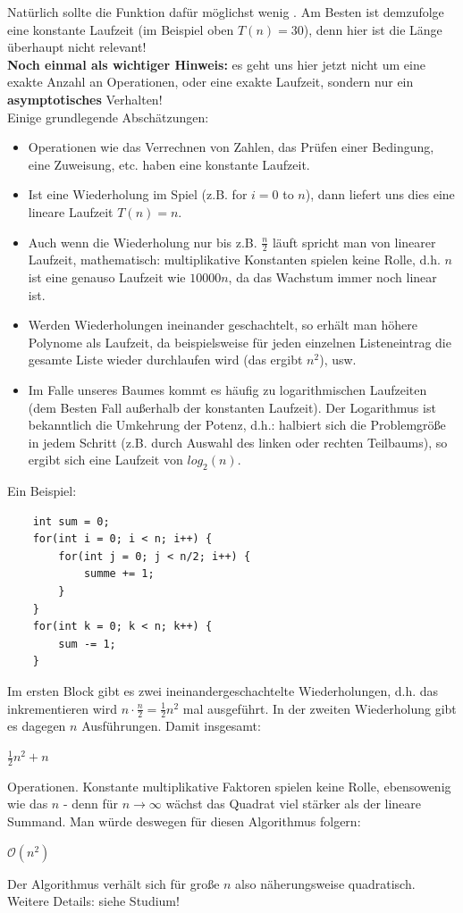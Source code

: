 \documentclass{article}
\begin{document}
Natürlich sollte die Funktion dafür möglichst wenig . Am Besten ist demzufolge eine konstante Laufzeit (im Beispiel oben $T(n)=30$), denn hier ist die Länge überhaupt nicht relevant! \\
\textbf{Noch einmal als wichtiger Hinweis:} es geht uns hier jetzt nicht um eine exakte Anzahl an Operationen, oder eine exakte Laufzeit, sondern nur ein \textbf{asymptotisches} Verhalten!  \\
Einige grundlegende Abschätzungen:
\begin{itemize}
    \item {} Operationen wie das Verrechnen von Zahlen, das Prüfen einer Bedingung, eine Zuweisung, etc. haben eine konstante Laufzeit. 
    \item Ist eine Wiederholung im Spiel (z.B. for $i = 0$ to $n$), dann liefert uns dies eine lineare Laufzeit $T(n) = n$.
    \item Auch wenn die Wiederholung nur bis z.B. $\frac{n}{2}$ läuft spricht man von linearer Laufzeit, mathematisch: multiplikative Konstanten spielen keine Rolle, d.h. $n$ ist eine genauso  Laufzeit wie $10000n$, da das Wachstum immer noch linear ist.
    \item Werden Wiederholungen ineinander geschachtelt, so erhält man höhere Polynome als Laufzeit, da beispielsweise für jeden einzelnen Listeneintrag die gesamte Liste wieder durchlaufen wird (das ergibt $n^2$), usw. 
    \item Im Falle unseres Baumes kommt es häufig zu logarithmischen Laufzeiten (dem Besten Fall außerhalb der konstanten Laufzeit). Der Logarithmus ist bekanntlich die Umkehrung der Potenz, d.h.: halbiert sich die Problemgröße in jedem Schritt (z.B. durch Auswahl des linken oder rechten Teilbaums), so ergibt sich eine Laufzeit von $log_2(n)$.  
\end{itemize}
Ein Beispiel:
\begin{verbatim}
    int sum = 0;
    for(int i = 0; i < n; i++) {
        for(int j = 0; j < n/2; i++) {
            summe += 1;
        }
    }
    for(int k = 0; k < n; k++) {
        sum -= 1;
    }
\end{verbatim}
Im ersten Block gibt es zwei ineinandergeschachtelte Wiederholungen, d.h. das inkrementieren wird $n \cdot \frac{n}{2} = \frac{1}{2} n^2$ mal ausgeführt. In der zweiten Wiederholung gibt es dagegen $n$ Ausführungen. Damit insgesamt:
\begin{center}
    $\frac{1}{2} n^2 + n$
\end{center}
Operationen. Konstante multiplikative Faktoren spielen keine Rolle, ebensowenig wie das $n$ - denn für $n\rightarrow \infty$ wächst das Quadrat viel stärker als der lineare Summand. Man würde deswegen für diesen Algorithmus folgern:
\begin{center}
    $\mathcal{O}(n^2)$
\end{center}
Der Algorithmus verhält sich für große $n$ also näherungsweise quadratisch. \\
Weitere Details: siehe Studium!
\end{document}
